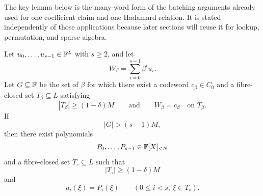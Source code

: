 The key lemma below is the many-word form of the batching arguments already used for one coefficient claim and one Hadamard relation.  It is stated independently of those applications because later sections will reuse it for lookup, permutation, and sparse algebra.

\begin{lemma}
\label{lem:master-correlated-agreement}
Let $u_0,\ldots,u_{s-1}\in\mathbb{F}^L$ with $s\ge2$, and let
\[
  W_\beta=\sum_{i=0}^{s-1}\beta^iu_i.
\]
Let $G\subseteq\mathbb{F}$ be the set of $\beta$ for which there exist a codeword $c_\beta\in C_0$ and a fibre-closed set $T_\beta\subseteq L$ satisfying
\begin{equation}
  |T_\beta|\ge(1-\delta)M
  \qquad\text{and}\qquad
  W_\beta=c_\beta\quad\text{on }T_\beta.
  \label{eq:master-good-beta}
\end{equation}
If
\begin{equation}
  |G|>(s-1)M,
  \label{eq:master-many-good}
\end{equation}
then there exist polynomials
\[
  P_0,\ldots,P_{s-1}\in\mathbb{F}[X]_{<N}
\]
and a fibre-closed set $T_\circ\subseteq L$ such that
\begin{equation}
  |T_\circ|\ge(1-\delta)M
  \label{eq:master-common-fibre-size}
\end{equation}
and
\begin{equation}
  u_i(\xi)=P_i(\xi)
  \qquad
  (0\le i<s,\ \xi\in T_\circ).
  \label{eq:master-common-fibre-agreement}
\end{equation}
\end{lemma}

